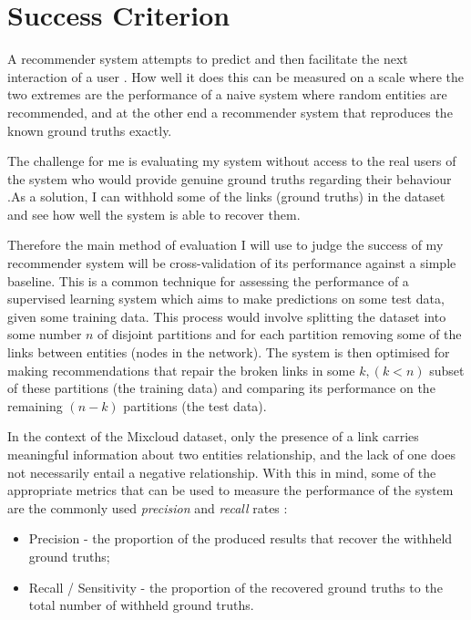 \section{Success Criterion}

A recommender system attempts to predict and then facilitate the next 
interaction of a user \cite{analysis_recsys_algs}. How well it does this can be 
measured on a scale where the two extremes are the performance of a naive 
system where random entities are recommended, and at the other end a 
recommender system that reproduces the known ground truths exactly. 

The challenge for me is evaluating my system without access to the real users 
of the system who would provide genuine ground truths regarding their behaviour 
\cite{eval_cfsys}.As a solution, I can withhold some of the links (ground 
truths) in the dataset and see how well the system is able to recover them.

Therefore the main method of evaluation I will use to judge the success of my 
recommender system will be cross-validation of its performance against a simple 
baseline. This is a common technique for assessing the performance of a 
supervised learning system which aims to make predictions on some test data, 
given some training data. This process would involve splitting the dataset into 
some number $n$ of disjoint partitions and for each partition removing some of 
the links between entities (nodes in the network). The system is then optimised 
for making recommendations that repair the broken links in some $k, (k < n)$ 
subset of these partitions (the training data) and comparing its performance on 
the remaining $(n-k)$ partitions (the test data). 

In the context of the Mixcloud dataset, only the presence of a link carries 
meaningful information about two entities relationship, and the lack of one 
does not necessarily entail a negative relationship. With this in mind, some of 
the appropriate metrics that can be used to measure the performance of the 
system are the commonly used \emph{precision} and \emph{recall} rates 
\cite{eval_measures}:
\begin{itemize}
 \item Precision - the proportion of the produced results that recover the 
withheld ground truths;
 \item Recall / Sensitivity - the proportion of the recovered ground truths to 
the total number of withheld ground truths.
\end{itemize}

